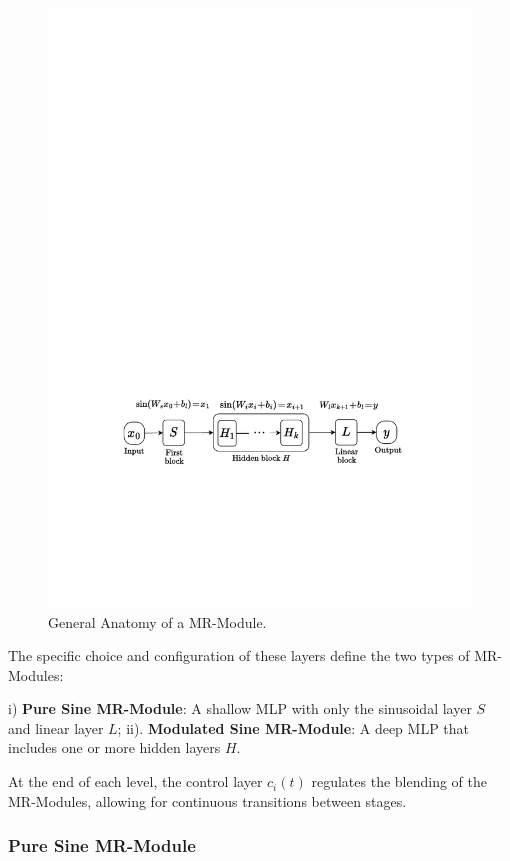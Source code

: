 \begin{figure}[!h]
    \centering
    \includegraphics[width=0.9\linewidth]{img/ch4/diagram_mr_module.pdf}
    \caption{General Anatomy of a MR-Module.}
    \label{f:mr-module}
\end{figure}

The specific choice and configuration of these layers define the two types of MR-Modules:

i) \textbf{Pure Sine MR-Module}: A shallow MLP with only the sinusoidal layer \( S \) and linear layer \( L \);
ii). \textbf{Modulated Sine MR-Module}: A deep MLP that includes one or more hidden layers \( H \).

At the end of each level, the control layer \( c_i(t) \) regulates the blending of the MR-Modules, allowing for continuous transitions between stages.

\subsubsection{Pure Sine MR-Module}


